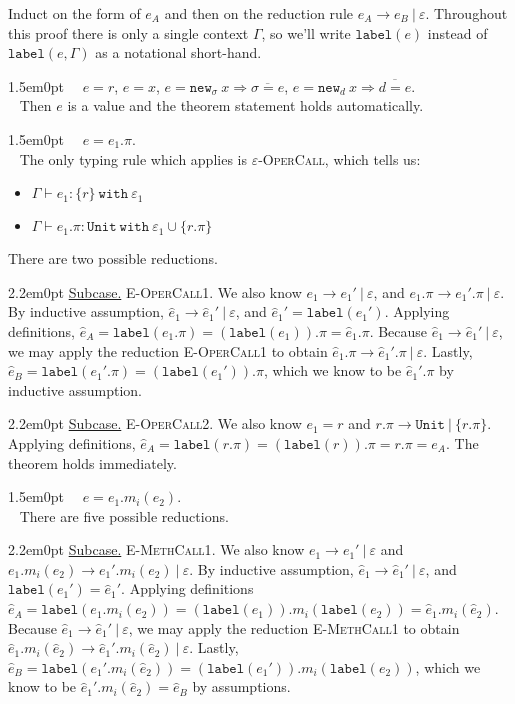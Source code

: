 \documentclass{llncs}
\newcommand{\keywadj}[1]{\mathtt{#1}}
\newcommand{\keyw}[1]{\keywadj{#1}~}
\newcommand{\proofcase}[2]{
	\begin{adjustwidth}{1.5em}{0pt}
		\fbox{Case.}~~#1. \\ ~#2
	\end{adjustwidth}
}
\newcommand{\subcase}[1] {
	\begin{adjustwidth}{2.2em}{0pt}
		\underline{Subcase.} #1
	\end{adjustwidth}
}
\newcommand{\type}[2]{
	#1~\keyw{with} #2
}
\newcommand{\newd}[0]{
	\keywadj{new}_d~x \Rightarrow \overline{d = e}
}
\newcommand{\newsig}[0]{
	\keywadj{new}_\sigma~x \Rightarrow \overline{\sigma = e}
}
\begin{document}
{Induct on the form of $e_A$ and then on the reduction rule $e_A \longrightarrow e_B~|~\varepsilon$. Throughout this proof there is only a single context $\Gamma$, so we'll write $\keywadj{label}(e)$ instead of $\keywadj{label}(e, \Gamma)$ as a notational short-hand.\\

\proofcase{$e=r$, $e=x$, $e=\newsig$, $e=\newd$}{
	Then $e$ is a value and the theorem statement holds automatically.\\
}

\proofcase{$e=e_1.\pi$}{
The only typing rule which applies is \textsc{$\varepsilon$-OperCall}, which tells us:
	\begin{itemize}
		\item $\Gamma \vdash e_1 : \type{ \{ r \} }{\varepsilon_1}$
		\item $\Gamma \vdash e_1.\pi : \type{\keywadj{Unit}}{\varepsilon_1 \cup \{ r.\pi \}}$
	\end{itemize}
\noindent
There are two possible reductions. \\

\subcase{\textsc{E-OperCall1}. We also know $e_1 \longrightarrow e_1'~|~\varepsilon$, and $e_1.\pi \longrightarrow e_1'.\pi~|~\varepsilon$. By inductive assumption, $\hat e_1 \longrightarrow \hat e_1'~|~\varepsilon$, and $\hat e_1' = \keywadj{label}(e_1')$. Applying definitions, $\hat e_A = \keywadj{label}(e_1.\pi) = (\keywadj{label}(e_1)).\pi = \hat e_1.\pi$. Because $\hat e_1 \longrightarrow \hat e_1'~|~\varepsilon$, we may apply the reduction \textsc{E-OperCall1} to obtain $\hat e_1.\pi \longrightarrow \hat e_1'.\pi~|~\varepsilon$. Lastly, $\hat e_B = \keywadj{label}(e_1'.\pi) = (\keywadj{label}(e_1')).\pi$, which we know to be $\hat e_1'.\pi$ by inductive assumption.\\
}

\subcase{\textsc{E-OperCall2}. We also know $e_1 = r$ and $r.\pi \longrightarrow \keywadj{Unit}~|~\{ r.\pi \}$. Applying definitions, $\hat e_A = \keywadj{label}(r.\pi) = (\keywadj{label}(r)).\pi = r.\pi = e_A$. The theorem holds immediately.\\

}
}
	
\proofcase{$e=e_1.m_i(e_2)$}{
\noindent
There are five possible reductions. \\

\subcase{ \textsc{E-MethCall1}. We also know $e_1 \longrightarrow e_1'~|~\varepsilon$ and $e_1.m_i(e_2) \longrightarrow e_1'.m_i(e_2)~|~\varepsilon$. By inductive assumption, $\hat e_1 \longrightarrow \hat e_1'~|~\varepsilon$, and $\keywadj{label}(e_1') = \hat e_1'$. Applying definitions $\hat e_A = \keywadj{label}(e_1.m_i(e_2)) = (\keywadj{label}(e_1)).m_i(\keywadj{label}(e_2)) = \hat e_1.m_i(\hat e_2)$. Because $\hat e_1 \longrightarrow \hat e_1'~|~\varepsilon$, we may apply the reduction \textsc{E-MethCall1} to obtain $\hat e_1.m_i(\hat e_2) \longrightarrow \hat e_1'.m_i(\hat e_2)~|~\varepsilon$. Lastly, $\hat e_B = \keywadj{label}(e_1'.m_i(\hat e_2)) = (\keywadj{label}(e_1')).m_i(\keywadj{label}(e_2))$, which we know to be $\hat e_1'.m_i(\hat e_2) = \hat e_B$ by assumptions.\\

}}}
\end{document}
